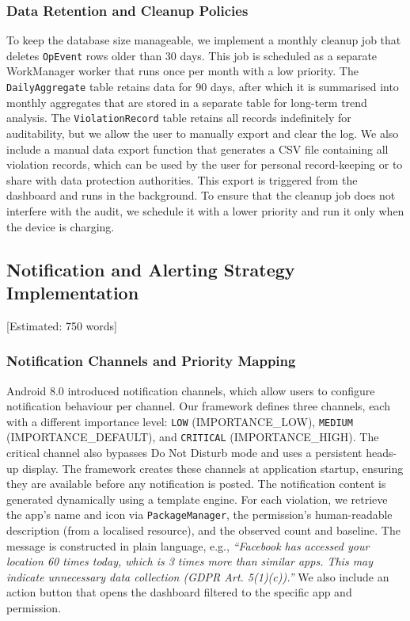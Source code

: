 \subsubsection{Data Retention and Cleanup Policies}

To keep the database size manageable, we implement a monthly cleanup job that deletes \texttt{OpEvent} rows older than 30 days. This job is scheduled as a separate WorkManager worker that runs once per month with a low priority. The \texttt{DailyAggregate} table retains data for 90 days, after which it is summarised into monthly aggregates that are stored in a separate table for long-term trend analysis. The \texttt{ViolationRecord} table retains all records indefinitely for auditability, but we allow the user to manually export and clear the log. We also include a manual data export function that generates a CSV file containing all violation records, which can be used by the user for personal record-keeping or to share with data protection authorities. This export is triggered from the dashboard and runs in the background. To ensure that the cleanup job does not interfere with the audit, we schedule it with a lower priority and run it only when the device is charging.

\subsection{Notification and Alerting Strategy Implementation} [Estimated: 750 words]

\subsubsection{Notification Channels and Priority Mapping}

Android 8.0 introduced notification channels, which allow users to configure notification behaviour per channel. Our framework defines three channels, each with a different importance level: \texttt{LOW} (IMPORTANCE\_LOW), \texttt{MEDIUM} (IMPORTANCE\_DEFAULT), and \texttt{CRITICAL} (IMPORTANCE\_HIGH). The critical channel also bypasses Do Not Disturb mode and uses a persistent heads-up display. The framework creates these channels at application startup, ensuring they are available before any notification is posted. The notification content is generated dynamically using a template engine. For each violation, we retrieve the app's name and icon via \texttt{PackageManager}, the permission's human-readable description (from a localised resource), and the observed count and baseline. The message is constructed in plain language, e.g., \textit{``Facebook has accessed your location 60 times today, which is 3 times more than similar apps. This may indicate unnecessary data collection (GDPR Art. 5(1)(c)).''} We also include an action button that opens the dashboard filtered to the specific app and permission.

